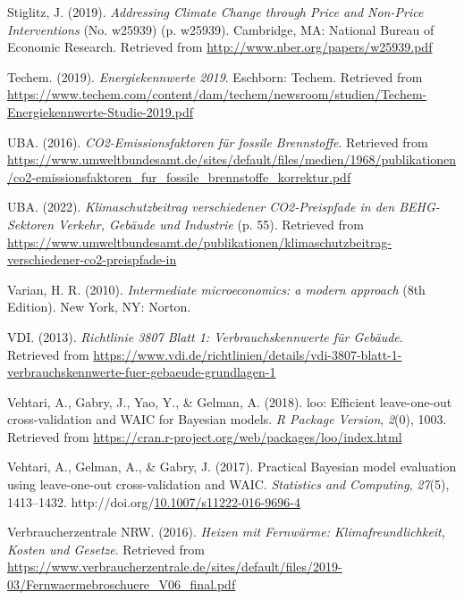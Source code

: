 \documentclass[12pt,twoside]{reedthesis}
\newlength{\cslhangindent}
\newenvironment{CSLReferences}[2] %
 {%
  \setlength{\parindent}{0pt}
  \ifodd #1 \everypar{\setlength{\hangindent}{\cslhangindent}}\ignorespaces\fi
  \ifnum #2 > 0
  \setlength{\parskip}{#2\baselineskip}
  \fi
 }%
 {}
\begin{document}
\begin{CSLReferences}{1}{0}
\leavevmode{}%
Stiglitz, J. (2019). \emph{Addressing Climate Change through Price and Non-Price Interventions} (No. w25939) (p. w25939). Cambridge, MA: National Bureau of Economic Research. Retrieved from \url{http://www.nber.org/papers/w25939.pdf}

\leavevmode{}%
Techem. (2019). \emph{Energiekennwerte 2019}. Eschborn: Techem. Retrieved from \url{https://www.techem.com/content/dam/techem/newsroom/studien/Techem-Energiekennwerte-Studie-2019.pdf}

\leavevmode{}%
UBA. (2016). \emph{CO2-Emissionsfaktoren für fossile Brennstoffe}. Retrieved from \url{https://www.umweltbundesamt.de/sites/default/files/medien/1968/publikationen/co2-emissionsfaktoren_fur_fossile_brennstoffe_korrektur.pdf}

\leavevmode{}%
UBA. (2022). \emph{Klimaschutzbeitrag verschiedener CO2-Preispfade in den BEHG-Sektoren Verkehr, Gebäude und Industrie} (p. 55). Retrieved from \url{https://www.umweltbundesamt.de/publikationen/klimaschutzbeitrag-verschiedener-co2-preispfade-in}

\leavevmode{}%
Varian, H. R. (2010). \emph{Intermediate microeconomics: a modern approach} (8th Edition). New York, NY: Norton.

\leavevmode{}%
VDI. (2013). \emph{Richtlinie 3807 Blatt 1: Verbrauchskennwerte für Gebäude}. Retrieved from \url{https://www.vdi.de/richtlinien/details/vdi-3807-blatt-1-verbrauchskennwerte-fuer-gebaeude-grundlagen-1}

\leavevmode{}%
Vehtari, A., Gabry, J., Yao, Y., \& Gelman, A. (2018). loo: Efficient leave-one-out cross-validation and WAIC for Bayesian models. \emph{R Package Version}, \emph{2}(0), 1003. Retrieved from \url{https://cran.r-project.org/web/packages/loo/index.html}

\leavevmode{}%
Vehtari, A., Gelman, A., \& Gabry, J. (2017). Practical Bayesian model evaluation using leave-one-out cross-validation and WAIC. \emph{Statistics and Computing}, \emph{27}(5), 1413--1432. http://doi.org/\href{https://doi.org/10.1007/s11222-016-9696-4}{10.1007/s11222-016-9696-4}

\leavevmode{}%
Verbraucherzentrale NRW. (2016). \emph{Heizen mit Fernwärme: Klimafreundlichkeit, Kosten und Gesetze}. Retrieved from \url{https://www.verbraucherzentrale.de/sites/default/files/2019-03/Fernwaermebroschuere_V06_final.pdf}


\end{CSLReferences}
\end{document}
